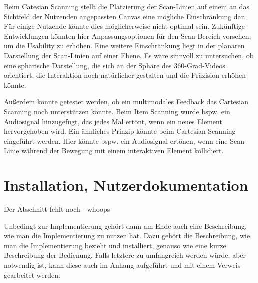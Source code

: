 Beim Catesian Scanning stellt die Platzierung der Scan-Linien auf einem an das Sichtfeld der Nutzenden angepassten Canvas eine mögliche Einschränkung dar. Für einige Nutzende könnte dies möglicherweise nicht optimal sein. Zukünftige Entwicklungen könnten hier Anpassungsoptionen für den Scan-Bereich vorsehen, um die Usability zu erhöhen. Eine weitere Einschränkung liegt in der planaren Darstellung der Scan-Linien auf einer Ebene. Es wäre sinnvoll zu untersuchen, ob eine sphärische Darstellung, die sich an der Sphäre des 360-Grad-Videos orientiert, die Interaktion noch natürlicher gestalten und die Präzision erhöhen könnte.

Außerdem könnte getestet werden, ob ein multimodales Feedback das Cartesian Scanning noch unterstützen könnte. Beim Item Scanning wurde bspw. ein Audiosignal hinzugefügt, das jedes Mal ertönt, wenn ein neues Element hervorgehoben wird. Ein ähnliches Prinzip könnte beim Cartesian Scanning eingeführt werden. Hier könnte bspw. ein Audiosignal ertönen, wenn eine Scan-Linie während der Bewegung mit einem interaktiven Element kollidiert. 

\section{Installation, Nutzerdokumentation}

Der Abschnitt fehlt noch - whoops 

Unbedingt zur Implementierung gehört dann am Ende auch eine Beschreibung, wie man die Implementierung zu nutzen hat. Dazu gehört die Beschreibung, wie man die Implementierung bezieht und installiert, genauso wie eine kurze Beschreibung der Bedienung. Falls letztere zu umfangreich werden würde, aber notwendig ist, kann diese auch im Anhang aufgeführt und mit einem Verweis gearbeitet werden.
